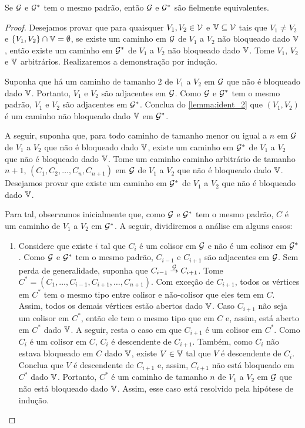 \begin{lemma}
 \label{lemma:fiel_equiv_2}
 Se ${\mathcal G}$ e ${\mathcal G}^*$ tem o mesmo padrão, então
 ${\mathcal G}$ e ${\mathcal G}^*$ são fielmente equivalentes.
\end{lemma}

\begin{proof}
 Desejamos provar que para quaisquer 
 $V_1, V_2 \in {\mathcal V}$ e ${\mathbb V} \subseteq {\mathcal V}$ tais que 
 $V_1 \neq V_2$ e $\{V_1, V_2\} \cap {\mathbb V} = \emptyset$,
 se existe um caminho em ${\mathcal G}$ de $V_1$ a $V_2$
 não bloqueado dado ${\mathbb V}$, então 
 existe um caminho em ${\mathcal G}^*$ de $V_1$ a $V_2$
 não bloqueado dado ${\mathbb V}$.
 Tome $V_1$, $V_2$ e ${\mathbb V}$ arbitrários.
 Realizaremos a demonstração por indução.
 
 Suponha que há um caminho de tamanho $2$ de 
 $V_1$ a $V_2$ em ${\mathcal G}$ que não é bloqueado dado ${\mathbb V}$.
 Portanto, $V_1$ e $V_2$ são adjacentes em ${\mathcal G}$.
 Como ${\mathcal G}$ e ${\mathcal G}^*$ tem o mesmo padrão,
 $V_1$ e $V_2$ são adjacentes em ${\mathcal G}^*$.
 Conclua do \cref{lemma:ident_2} que
 $(V_1, V_2)$ é um caminho não bloqueado dado ${\mathbb V}$ em ${\mathcal G}^*$.
 
 A seguir, suponha que, para todo caminho de
 tamanho menor ou igual a $n$ em ${\mathcal G}$ de $V_1$ a $V_2$
 que não é bloqueado dado ${\mathbb V}$, existe
 um caminho em ${\mathcal G}^*$ de $V_1$ a $V_2$ que
 não é bloqueado dado ${\mathbb V}$.
 Tome um caminho caminho arbitrário de tamanho $n+1$,
 $(C_1, C_2, \ldots, C_n, C_{n+1})$
 em ${\mathcal G}$ de $V_1$ a $V_2$ que não é bloqueado dado ${\mathbb V}$.
 Desejamos provar que existe um caminho em ${\mathcal G}^*$
 de $V_1$ a $V_2$ que não é bloqueado dado ${\mathbb V}$.
 
 Para tal, observamos inicialmente que,
 como ${\mathcal G}$ e ${\mathcal G}^*$ tem o mesmo padrão,
 $C$ é um caminho de $V_1$ a $V_2$ em ${\mathcal G}^*$.
 A seguir, dividiremos a análise em alguns casos:
 
 \begin{enumerate}[label=\alph*)]
  \item Considere que existe $i$ tal que
  $C_i$ é um colisor em ${\mathcal G}$ e
  não é um colisor em ${\mathcal G}^*$.
  Como ${\mathcal G}$ e ${\mathcal G}^*$ tem o mesmo padrão,
  $C_{i-1}$ e $C_{i+1}$ são adjacentes em ${\mathcal G}$.
  Sem perda de generalidade, suponha que
  $C_{i-1} \stackrel{{\mathcal G}}{\rightarrow} C_{i+1}$.
  Tome $C^* = (C_1,\ldots,C_{i-1},C_{i+1},\ldots,C_{n+1})$.
  Com exceção de $C_{i+1}$, todos os vértices em $C^*$
  tem o mesmo tipo entre colisor e não-colisor que eles tem em $C$.
  Assim, todos os demais vértices estão abertos dado ${\mathbb V}$.
  Caso $C_{i+1}$ não seja um colisor em $C^*$, então
  ele tem o mesmo tipo que em $C$ e, assim, 
  está aberto em $C^*$ dado ${\mathbb V}$.
  A seguir, resta o caso em que $C_{i+1}$ é 
  um colisor em $C^*$. 
  Como $C_i$ é um colisor em $C$,
  $C_i$ é descendente de $C_{i+1}$.
  Também, como $C_i$ não estava bloqueado em $C$ dado ${\mathbb V}$,
  existe $V \in {\mathbb V}$ tal que $V$ é descendente de $C_i$.
  Conclua que $V$ é descendente de $C_{i+1}$ e,
  assim, $C_{i+1}$ não está bloqueado em $C^*$ dado ${\mathbb V}$.
  Portanto, $C^*$ é um caminho de tamanho $n$ 
  de $V_1$ a $V_2$ em ${\mathcal G}$ que não está bloqueado dado ${\mathbb V}$.
  Assim, esse caso está resolvido pela hipótese de indução.  
  

\end{enumerate}
\end{proof}
